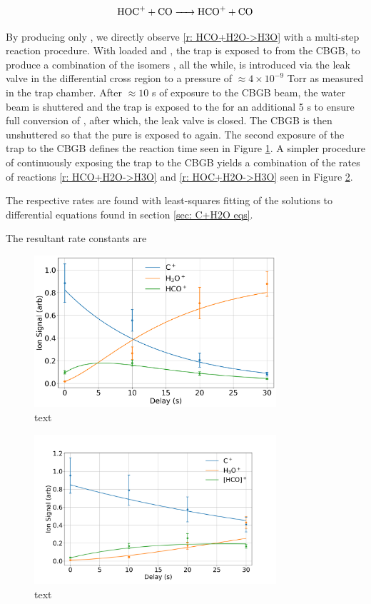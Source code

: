 \begin{equation}
\ce{HOC+ + CO -> HCO+ + CO} \label{r: HOC+CO->HCO}
\end{equation}

By producing only , we directly observe \ref{r: HCO+H2O->H3O} with a multi-step reaction procedure. With loaded  and , the trap is exposed to  from the CBGB, to produce a combination of the isomers \ce{[HCO]+}, all the while,  is introduced via the leak valve in the differential cross region to a pressure of $\approx 4 \times 10^{-9}$ Torr as measured in the trap chamber. After $\approx 10$ s of exposure to the CBGB beam, the water beam is shuttered and the trap is exposed to the  for an additional 5 s to ensure full conversion of , after which, the leak valve is closed. The CBGB is then unshuttered so that the pure  is exposed to  again. The second exposure of the trap to the CBGB defines the reaction time seen in Figure \ref{fig: HCO+H2O rate}. A simpler procedure of continuously exposing the trap to the CBGB yields a combination of the rates of reactions \ref{r: HCO+H2O->H3O} and \ref{r: HOC+H2O->H3O} seen in Figure \ref{fig: [HCO]+H2O rate}.


The respective rates are found with least-squares fitting of the solutions to differential equations found in section \ref{sec: C+H2O eqs}.

The resultant rate constants are 

\begin{figure}
	\centering
	\includegraphics[width=0.8\textwidth]{images/C_H2O_CO_traces.png}
	\caption{text}
	\label{fig: HCO+H2O rate}
\end{figure}

\begin{figure}
	\centering
	\includegraphics[width=0.8\textwidth]{images/C_H2O_beam_traces.png}
	\caption{text}
	\label{fig: [HCO]+H2O rate}
\end{figure}